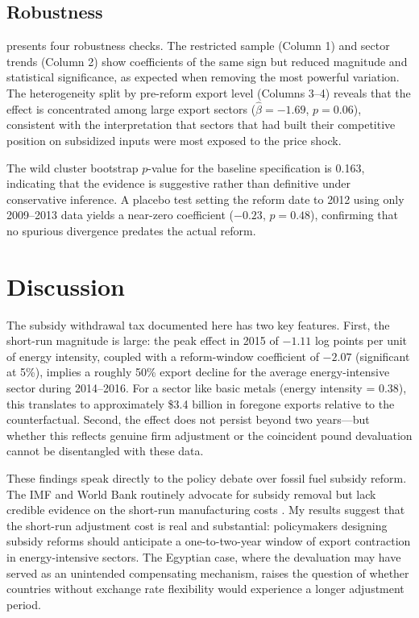 \documentclass[12pt]{article}
\begin{document}


\subsection{Robustness}

 presents four robustness checks. The restricted sample (Column 1) and sector trends (Column 2) show coefficients of the same sign but reduced magnitude and statistical significance, as expected when removing the most powerful variation. The heterogeneity split by pre-reform export level (Columns 3--4) reveals that the effect is concentrated among large export sectors ($\hat{\beta} = -1.69$, $p = 0.06$), consistent with the interpretation that sectors that had built their competitive position on subsidized inputs were most exposed to the price shock.

The wild cluster bootstrap $p$-value for the baseline specification is 0.163, indicating that the evidence is suggestive rather than definitive under conservative inference. A placebo test setting the reform date to 2012 using only 2009--2013 data yields a near-zero coefficient ($-0.23$, $p = 0.48$), confirming that no spurious divergence predates the actual reform.



\section{Discussion}

The subsidy withdrawal tax documented here has two key features. First, the short-run magnitude is large: the peak effect in 2015 of $-1.11$ log points per unit of energy intensity, coupled with a reform-window coefficient of $-2.07$ (significant at 5\%), implies a roughly 50\% export decline for the average energy-intensive sector during 2014--2016. For a sector like basic metals (energy intensity = 0.38), this translates to approximately \$3.4 billion in foregone exports relative to the counterfactual. Second, the effect does not persist beyond two years---but whether this reflects genuine firm adjustment or the coincident pound devaluation cannot be disentangled with these data.

These findings speak directly to the policy debate over fossil fuel subsidy reform. The IMF and World Bank routinely advocate for subsidy removal but lack credible evidence on the short-run manufacturing costs \citep{coady2019global, parry2021still}. My results suggest that the short-run adjustment cost is real and substantial: policymakers designing subsidy reforms should anticipate a one-to-two-year window of export contraction in energy-intensive sectors. The Egyptian case, where the devaluation may have served as an unintended compensating mechanism, raises the question of whether countries without exchange rate flexibility would experience a longer adjustment period.
\end{document}
